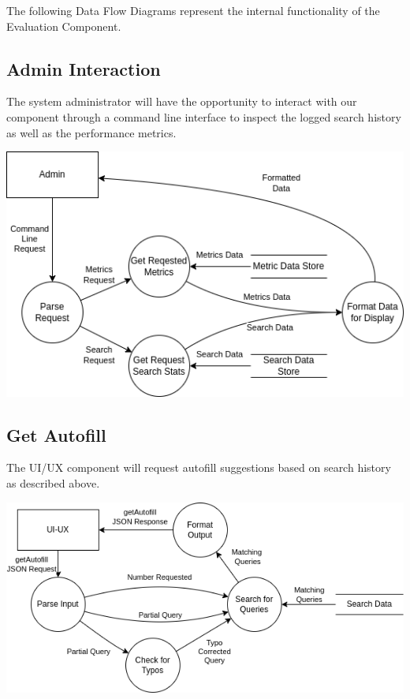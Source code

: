 The following Data Flow Diagrams represent the internal functionality of the Evaluation Component.

\subsection*{Admin Interaction}

The system administrator will have the opportunity to interact with our component through a command line interface to inspect the logged search history as well as the performance metrics.

\begin{center}
  \includegraphics[scale=0.7]{DFDs/LowLevelDFDs-AdminView.drawio.png}
\end{center}

\newpage
\subsection*{Get Autofill}

The UI/UX component will request autofill suggestions based on search history as described above.

\begin{center}
  \includegraphics[scale=0.7]{DFDs/LowLevelDFDs-GetAutofill.drawio.png}
\end{center}

